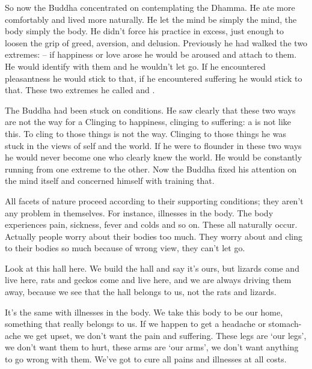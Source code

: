 So now the Buddha concentrated on contemplating the Dhamma. He ate more comfortably and lived more naturally. He let the mind be simply the mind, the body simply the body. He didn't force his practice in excess, just enough to loosen the grip of greed, aversion, and delusion. Previously he had walked the two extremes:  -- if happiness or love arose he would be aroused and attach to them. He would identify with them and he wouldn't let go. If he encountered pleasantness he would stick to that, if he encountered suffering he would stick to that. These two extremes he called  and . 

The Buddha had been stuck on conditions. He saw clearly that these two ways are not the way for a  Clinging to happiness, clinging to suffering: a  is not like this. To cling to those things is not the way. Clinging to those things he was stuck in the views of self and the world. If he were to flounder in these two ways he would never become one who clearly knew the world. He would be constantly running from one extreme to the other. Now the Buddha fixed his attention on the mind itself and concerned himself with training that. 

All facets of nature proceed according to their supporting conditions; they aren't any problem in themselves. For instance, illnesses in the body. The body experiences pain, sickness, fever and colds and so on. These all naturally occur. Actually people worry about their bodies too much. They worry about and cling to their bodies so much because of wrong view, they can't let go. 

Look at this hall here. We build the hall and say it's ours, but lizards come and live here, rats and geckos come and live here, and we are always driving them away, because we see that the hall belongs to us, not the rats and lizards. 

It's the same with illnesses in the body. We take this body to be our home, something that really belongs to us. If we happen to get a headache or stomach-ache we get upset, we don't want the pain and suffering. These legs are `our legs', we don't want them to hurt, these arms are `our arms', we don't want anything to go wrong with them. We've got to cure all pains and illnesses at all costs. 

